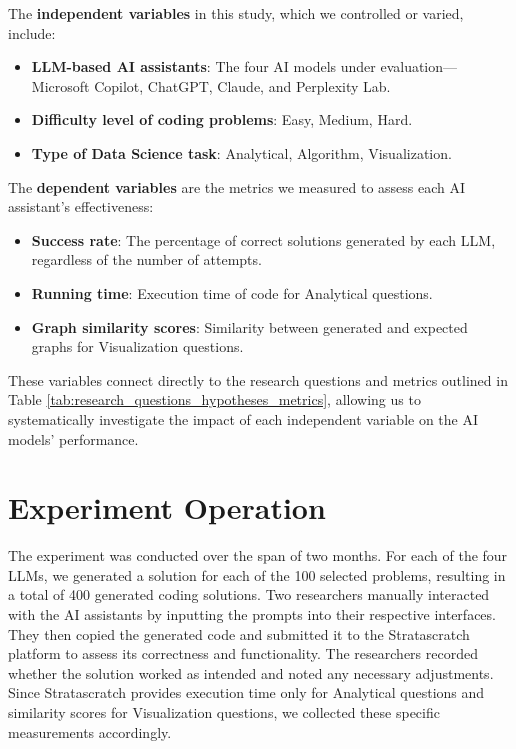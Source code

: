 \documentclass[conference]{IEEEtran}
\begin{document}
The \textbf{independent variables} in this study, which we controlled or varied, include:
\begin{itemize}
    \item \textbf{LLM-based AI assistants}: The four AI models under evaluation—Microsoft Copilot, ChatGPT, Claude, and Perplexity Lab.
    \item \textbf{Difficulty level of coding problems}: Easy, Medium, Hard.
    \item \textbf{Type of Data Science task}: Analytical, Algorithm, Visualization.
\end{itemize}

The \textbf{dependent variables} are the metrics we measured to assess each AI assistant's effectiveness:
\begin{itemize}
    \item \textbf{Success rate}: The percentage of correct solutions generated by each LLM, regardless of the number of attempts.
    \item \textbf{Running time}: Execution time of code for Analytical questions.
    \item \textbf{Graph similarity scores}: Similarity between generated and expected graphs for Visualization questions.
\end{itemize}

These variables connect directly to the research questions and metrics outlined in Table \ref{tab:research_questions_hypotheses_metrics}, allowing us to systematically investigate the impact of each independent variable on the AI models' performance. %



\section{Experiment Operation}

The experiment was conducted over the span of two months. For each of the four LLMs, we generated a solution for each of the 100 selected problems, resulting in a total of 400 generated coding solutions. Two researchers manually interacted with the AI assistants by inputting the prompts into their respective interfaces. They then copied the generated code and submitted it to the Stratascratch platform to assess its correctness and functionality. The researchers recorded whether the solution worked as intended and noted any necessary adjustments. Since Stratascratch provides execution time only for Analytical questions and similarity scores for Visualization questions, we collected these specific measurements accordingly.
\end{document}
